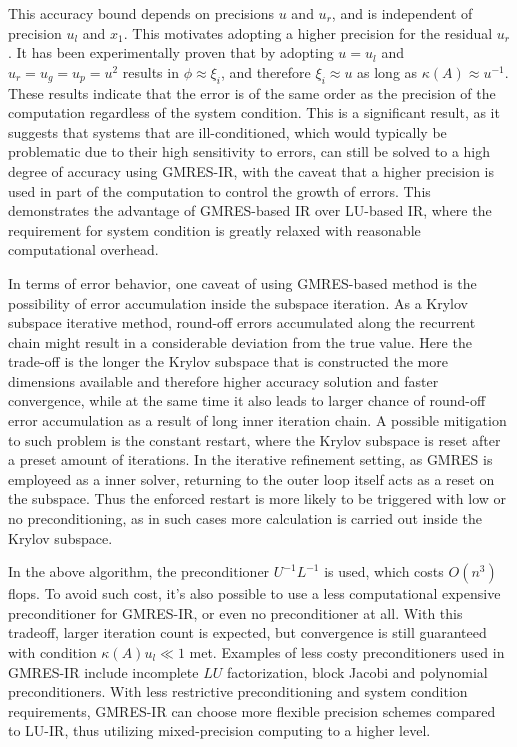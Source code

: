 This accuracy bound depends on precisions $u$ and $u_r$, and is independent of precision $u_l$ and $x_1$. This motivates adopting a higher precision for the residual $u_r$. It has been experimentally proven that by adopting $u=u_l$ and $u_r=u_g=u_p=u^2$ results in $\phi \approx \xi_i$, and therefore $\xi_i\approx u$ as long as $\kappa(A)\approx u^{-1}$\cite{Boris2021}. These results indicate that the error is of the same order as the precision of the computation regardless of the system condition. This is a significant result, as it suggests that systems that are ill-conditioned, which would typically be problematic due to their high sensitivity to errors, can still be solved to a high degree of accuracy using GMRES-IR, with the caveat that a higher precision is used in part of the computation to control the growth of errors. This demonstrates the advantage of GMRES-based IR over LU-based IR, where the requirement for system condition is greatly relaxed with reasonable computational overhead. 

In terms of error behavior, one caveat of using GMRES-based method is the possibility of error accumulation inside the subspace iteration. As a Krylov subspace iterative method, round-off errors accumulated along the recurrent chain might result in a considerable deviation from the true value. Here the trade-off is the longer the Krylov subspace that is constructed the more dimensions available and therefore higher accuracy solution and faster convergence, while at the same time it also leads to larger chance of round-off error accumulation as a result of long inner iteration chain. A possible mitigation to such problem is the constant restart, where the Krylov subspace is reset after a preset amount of iterations. In the iterative refinement setting, as GMRES is employeed as a inner solver, returning to the outer loop itself acts as a reset on the subspace. Thus the enforced restart is more likely to be triggered with low or no preconditioning, as in such cases more calculation is carried out inside the Krylov subspace.

In the above algorithm, the preconditioner $U^{-1}L^{-1}$ is used, which costs $O(n^3)$ flops. To avoid such cost, it's also possible to use a less computational expensive preconditioner for GMRES-IR, or even no preconditioner at all. With this tradeoff, larger iteration count is expected, but convergence is still guaranteed with condition $\kappa(A)u_l \ll 1$ met. Examples of less costy preconditioners used in GMRES-IR include incomplete $LU$ factorization, block Jacobi and polynomial preconditioners\cite{Loe2021}. With less restrictive preconditioning and system condition requirements, GMRES-IR can choose more flexible precision schemes compared to LU-IR, thus utilizing mixed-precision computing to a higher level. 

\clearpage




